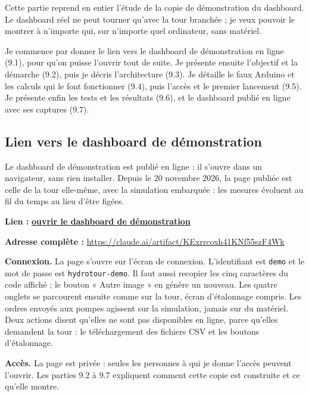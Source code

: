\clearpage
{}

Cette partie reprend en entier l'étude de la copie de démonstration du dashboard. Le dashboard réel ne peut tourner qu'avec la tour branchée ; je veux pouvoir le montrer à n'importe qui, sur n'importe quel ordinateur, sans matériel.

Je commence par donner le lien vers le dashboard de démonstration en ligne (9.1), pour qu'on puisse l'ouvrir tout de suite. Je présente ensuite l'objectif et la démarche (9.2), puis je décris l'architecture (9.3). Je détaille le faux Arduino et les calculs qui le font fonctionner (9.4), puis l'accès et le premier lancement (9.5). Je présente enfin les tests et les résultats (9.6), et le dashboard publié en ligne avec ses captures (9.7).

\subsection{Lien vers le dashboard de démonstration}

Le dashboard de démonstration est publié en ligne : il s'ouvre dans un navigateur, sans rien installer. Depuis le 20 novembre 2026, la page publiée est celle de la tour elle-même, avec la simulation embarquée : les mesures évoluent au fil du temps au lieu d'être figées.

\textbf{Lien :} \href{https://claude.ai/artifact/KExrrcoxh41KNf55szF4Wk}{\textbf{ouvrir le dashboard de démonstration}}

\textbf{Adresse complète :} \url{https://claude.ai/artifact/KExrrcoxh41KNf55szF4Wk}

\textbf{Connexion.} La page s'ouvre sur l'écran de connexion. L'identifiant est \texttt{demo} et le mot de passe est \texttt{hydrotour-demo}. Il faut aussi recopier les cinq caractères du code affiché ; le bouton « Autre image » en génère un nouveau. Les quatre onglets se parcourent ensuite comme sur la tour, écran d'étalonnage compris. Les ordres envoyés aux pompes agissent sur la simulation, jamais sur du matériel. Deux actions disent qu'elles ne sont pas disponibles en ligne, parce qu'elles demandent la tour : le téléchargement des fichiers CSV et les boutons d'étalonnage.

\textbf{Accès.} La page est privée : seules les personnes à qui je donne l'accès peuvent l'ouvrir. Les parties 9.2 à 9.7 expliquent comment cette copie est construite et ce qu'elle montre.

